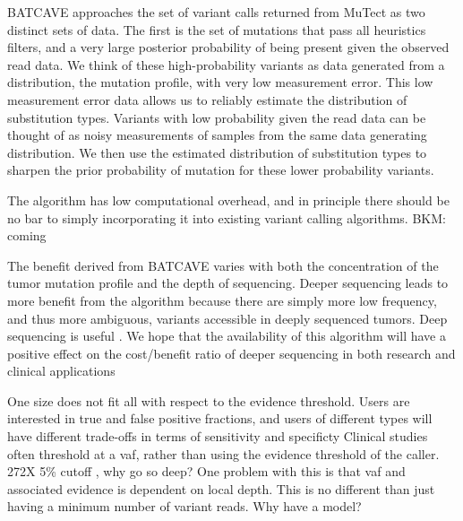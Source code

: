 \documentclass[a4,center,fleqn]{NAR}
\newcommand{\bkmcomment}[1]{{\color{blue}BKM: #1}}
\newcommand{\batcave}{BATCAVE }
\begin{document}
\batcave approaches the set of variant calls returned from MuTect as two distinct sets of data.
The first is the set of mutations that pass all heuristics filters, and a very large posterior probability of being present given the observed read data.
We think of these high-probability variants as data generated from a distribution, the mutation profile, with very low measurement error.
This low measurement error data allows us to reliably estimate the distribution of substitution types.
Variants with low probability given the read data can be thought of as noisy measurements of samples from the same data generating distribution.
We then use the estimated distribution of substitution types to sharpen the prior probability of mutation for these lower probability variants.

The algorithm has low computational overhead, and in principle there should be no bar to simply incorporating it into existing variant calling algorithms.
\bkmcomment{coming}

The benefit derived from \batcave varies with both the concentration of the tumor mutation profile and the depth of sequencing.
Deeper sequencing leads to more benefit from the algorithm because there are simply more low frequency, and thus more ambiguous, variants accessible in deeply sequenced tumors.
Deep sequencing is useful \cite{Zehir2017}.
We hope that the availability of this algorithm will have a positive effect on the cost/benefit ratio of deeper sequencing in both research and clinical applications


One size does not fit all with respect to the evidence threshold. Users are interested in true and false positive fractions, and users of different types will have different trade-offs in terms of sensitivity and specificty
Clinical studies often threshold at a vaf, rather than using the evidence threshold of the caller. 272X 5\% cutoff \cite{Parsons2016}, why go so deep?
One problem with this is that vaf and associated evidence is dependent on local depth. This is no different than just having a minimum number of variant reads. Why have a model?
\end{document}
